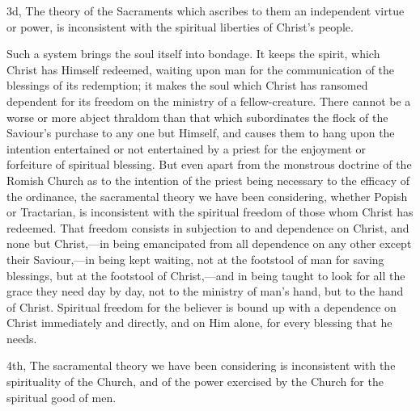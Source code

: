 \documentclass[]{book}
\begin{document}
3d, The theory of the Sacraments which ascribes to them an independent virtue or power, is inconsistent with the spiritual liberties of Christ's people.

Such a system brings the soul itself into bondage. It keeps the spirit, which Christ has Himself redeemed, waiting upon man for the communication of the blessings of its redemption; it makes the soul which Christ has ransomed dependent for its freedom on the ministry of a fellow-creature. There cannot be a worse or more abject thraldom than that which subordinates the flock of the Saviour's purchase to any one but Himself, and causes them to hang upon the intention entertained or not entertained by a priest for the enjoyment or forfeiture of spiritual blessing. But even apart from the monstrous doctrine of the Romish Church as to the intention of the priest being necessary to the efficacy of the ordinance, the sacramental theory we have been considering, whether Popish or Tractarian, is inconsistent with the spiritual freedom of those whom Christ has redeemed. That freedom consists in subjection to and dependence on Christ, and none but Christ,---in being emancipated from all dependence on any other except their Saviour,---in being kept waiting, not at the footstool of man for saving blessings, but at the footstool of Christ,---and in being taught to look for all the grace they need day by day, not to the ministry of man's hand, but to the hand of Christ. Spiritual freedom for the believer is bound up with a dependence on Christ immediately and directly, and on Him alone, for every blessing that he needs.

4th, The sacramental theory we have been considering is inconsistent with the spirituality of the Church, and of the power exercised by the Church for the spiritual good of men.
\end{document}
